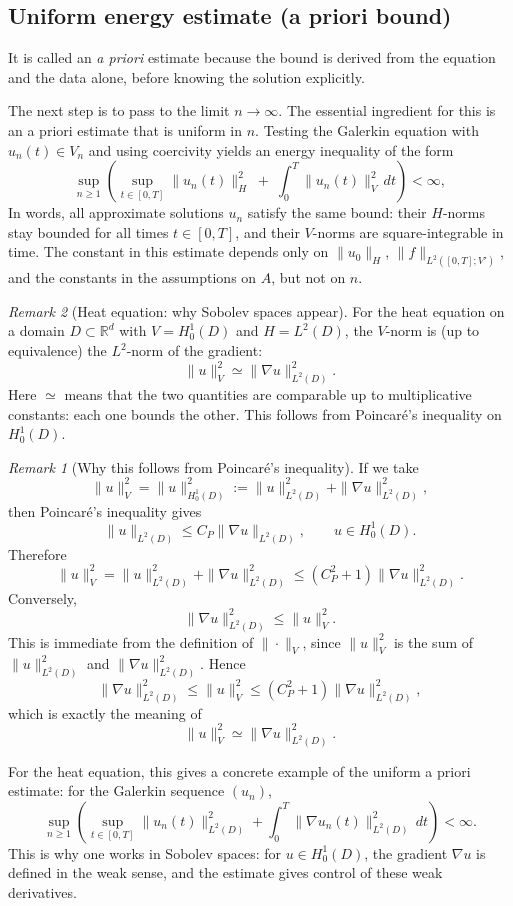 \documentclass[11pt]{article}
\theoremstyle{definition}
\theoremstyle{remark}
\newtheorem{remark}{Remark}
\begin{document}
\subsection*{Uniform energy estimate (a priori bound)}

It is called an \emph{a priori} estimate because the bound is derived from the equation and the
data alone, before knowing the solution explicitly.

The next step is to pass to the limit $n\to\infty$. The essential ingredient for this is an a
priori estimate that is uniform in $n$.
Testing the Galerkin equation with $u_n(t)\in V_n$ and using coercivity yields an energy inequality of the form
\[
\sup_{n\ge 1}\left(\sup_{t\in[0,T]}\|u_n(t)\|_H^2 \;+\; \int_0^T \|u_n(t)\|_V^2\,dt\right) < \infty,
\]
In words, all approximate solutions $u_n$ satisfy the same bound: their $H$-norms stay bounded
for all times $t\in[0,T]$, and their $V$-norms are square-integrable in time. The constant in
this estimate depends only on $\|u_0\|_H$, $\|f\|_{L^2([0,T];V')}$, and the constants in the
assumptions on $A$, but not on $n$.

\begin{remark}[Heat equation: why Sobolev spaces appear]
For the heat equation on a domain $D\subset\mathbb{R}^d$ with $V=H_0^1(D)$ and $H=L^2(D)$, the $V$-norm is (up to equivalence) the $L^2$-norm of the gradient:
\[
\|u\|_V^2 \simeq \|\nabla u\|_{L^2(D)}^2.
\]
Here $\simeq$ means that the two quantities are comparable up to multiplicative constants: each
one bounds the other. This follows from Poincar\'e's inequality on $H_0^1(D)$.

\begin{remark}[Why this follows from Poincar\'e's inequality]
If we take
\[
\|u\|_V^2=\|u\|_{H_0^1(D)}^2:=\|u\|_{L^2(D)}^2+\|\nabla u\|_{L^2(D)}^2,
\]
then Poincar\'e's inequality gives
\[
\|u\|_{L^2(D)} \le C_P\|\nabla u\|_{L^2(D)},
\qquad u\in H_0^1(D).
\]
Therefore
\[
\|u\|_V^2
=
\|u\|_{L^2(D)}^2+\|\nabla u\|_{L^2(D)}^2
\le
(C_P^2+1)\|\nabla u\|_{L^2(D)}^2.
\]
Conversely,
\[
\|\nabla u\|_{L^2(D)}^2 \le \|u\|_V^2.
\]
This is immediate from the definition of $\|\cdot\|_V$, since $\|u\|_V^2$ is the sum of
$\|u\|_{L^2(D)}^2$ and $\|\nabla u\|_{L^2(D)}^2$.
Hence
\[
\|\nabla u\|_{L^2(D)}^2 \le \|u\|_V^2 \le (C_P^2+1)\|\nabla u\|_{L^2(D)}^2,
\]
which is exactly the meaning of
\[
\|u\|_V^2 \simeq \|\nabla u\|_{L^2(D)}^2.
\]
\end{remark}

For the heat equation, this gives a concrete example of the uniform a priori estimate: for the
Galerkin sequence $(u_n)$,
\[
\sup_{n\ge 1}\left(\sup_{t\in[0,T]}\|u_n(t)\|_{L^2(D)}^2+\int_0^T\|\nabla u_n(t)\|_{L^2(D)}^2\,dt\right)<\infty.
\]
This is why one works in Sobolev spaces: for $u\in H_0^1(D)$, the gradient $\nabla u$ is defined
in the weak sense, and the estimate gives control of these weak derivatives.
\end{remark}
\end{document}
